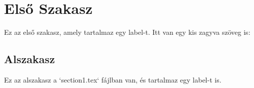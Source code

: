 \section{Első Szakasz}
\label{sec:first}

Ez az első szakasz, amely tartalmaz egy label-t. Itt van egy kis zagyva szöveg is:

\lipsum[1]

\subsection{Alszakasz}
\label{sec:sub}

Ez az alszakasz a `section1.tex` fájlban van, és tartalmaz egy label-t is.

\lipsum[2]